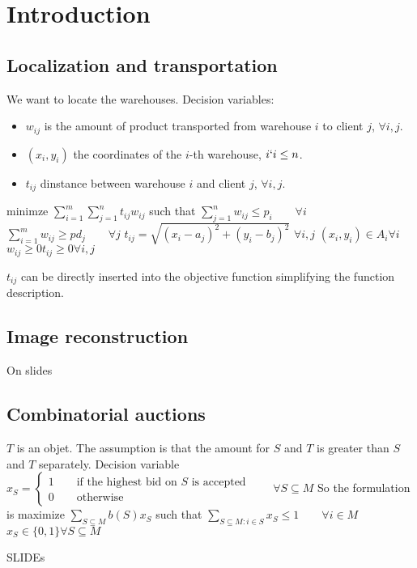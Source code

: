 \section{Introduction}


\subsection{Localization and transportation}

We want to locate the warehouses. 
Decision variables:
\begin{itemize}
    \item $w_{ij}$ is the amount of product transported from warehouse $i$ to client $j$, $\forall i,j$. 
    \item $(x_i,y_i)$ the coordinates of the $i$-th warehouse, $i\lq i\leq n$. 
    \item $t_{ij}$ dinstance between warehouse $i$ and client $j$, $\forall i,j$. 
\end{itemize}


minimze $\sum_{i=1}^{m}\sum_{j=1}^{n}t_{ij}w_{ij}$ such that 
$\sum_{j=1}^{n}w_{ij}\leq p_i \qquad \forall i$
$\sum_{i=1}^{m}w_{ij}\geq pd_j \qquad \forall j$
$t_{ij}=\sqrt{(x_{i}-a_j)^2+(y_{i}-b_j)^2}$ $\forall i,j$
$(x_i,y_i)\in A_i \forall i$
$w_{ij}\geq 0 t_{ij}\geq 0\forall i,j$

$t_{ij}$ can be directly inserted into the objective function simplifying the function description.



\subsection{Image reconstruction}
On slides 

\subsection{Combinatorial auctions}
$T$ is an objet.
The assumption is that the amount for $S$ and $T$ is greater than $S$ and $T$ separately.
Decision variable $x_S=\begin{cases}
    1\qquad\text{if the highest bid on }S\text{ is accepted} \\
    0\qquad \text{otherwise}
\end{cases}\qquad\forall S\subseteq M$
So the formulation is maximize $\sum_{S\subseteq M}b(S)x_S$ such that 
$\sum_{S\subseteq M:i\in S}x_S\leq 1\qquad \forall i \in M$
$x_S\in\{0,1\}\forall S \subseteq M$



SLIDEs